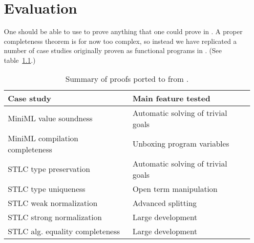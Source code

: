\chapter{Evaluation}
\label{sec:evaluation}

One should be able to use \Harpoon{} to prove anything that one could prove in
\Beluga. A proper completeness theorem is for now too complex\footnotemark, so
instead we have replicated a number of case studies originally proven as
functional programs in \Beluga. (See table~\ref{table:evaluation}.)

\begin{table}[h]
  \centering
  \begin{tabular}{%
    m{} m{} %
    }
    Case study
    & Main feature tested
    \\ \hline
    MiniML value soundness
    & Automatic solving of trivial goals
    \\
    MiniML compilation completeness
    & Unboxing program variables
    \\
    STLC type preservation
    & Automatic solving of trivial goals
    \\
    STLC type uniqueness
    & Open term manipulation
    \\
    STLC weak normalization
    & Advanced splitting
    \\
    STLC strong normalization \cite{POPLMarkReloaded:19}
    & Large development
    \\
    STLC alg. equality completeness \cite{Cave:MSCS18}
    & Large development
    \\
  \end{tabular}

  \caption{%
    Summary of proofs ported to \Harpoon{} from \Beluga.
  }
  \label{table:evaluation}
\end{table}

